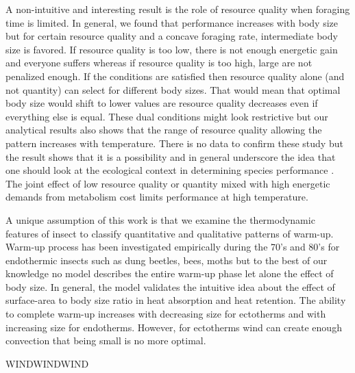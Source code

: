 A non-intuitive and interesting result is the role of resource quality when foraging time is limited.
In general, we found that performance increases with body size but for certain resource quality and a concave foraging rate,  intermediate body size is favored.
If resource quality is too low, there is not enough energetic gain and everyone suffers whereas if resource quality is too high, large are not penalized enough.
If the conditions are satisfied then resource quality alone (and not quantity) can select for different body sizes.
That would mean that optimal body size would shift to lower values are resource quality decreases even if  everything else is equal.
These dual conditions might look restrictive but our analytical results also shows that the range of resource quality allowing the pattern increases with temperature. 
There is no data to confirm these study but the result shows that it is a possibility and in general  underscore the idea that one should look at the ecological context in determining species performance \citep{Sears2015}.
The joint effect of low resource quality or quantity mixed with high energetic demands from  metabolism cost limits performance at high temperature.

A unique assumption of this work is that we examine the thermodynamic features of insect to classify quantitative and qualitative patterns of warm-up.
Warm-up process has been investigated empirically during the 70's and 80's for endothermic insects  such as dung beetles, bees, moths \citep{Heinrich1975, Bartholomew1978, Bartholomew1981} but to the best of our knowledge no model describes the entire warm-up phase let alone the effect of body size.
In general, the model validates the intuitive idea about  the effect of surface-area to body size ratio in heat absorption and heat retention.
The ability to complete warm-up increases with decreasing size for ectotherms and with increasing size for endotherms.
However, for ectotherms wind can create enough convection that being small is no more optimal. %

WINDWINDWIND

